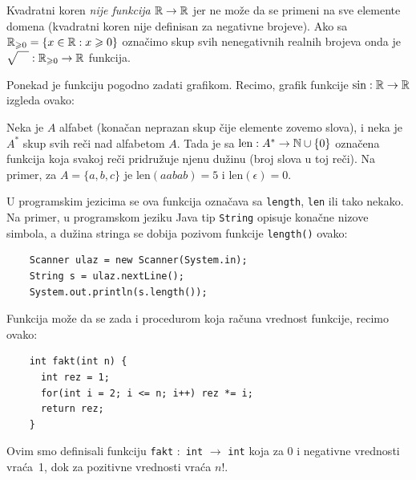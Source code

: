 \begin{EX}
  Kvadratni koren \emph{nije funkcija $\mathbb{R} \to \mathbb{R}$} jer ne mo\v ze da se primeni na sve elemente domena (kvadratni koren
  nije definisan za negativne brojeve). Ako sa $\mathbb{R}_{\geqslant 0} = \{x \in \mathbb{R} : x \geqslant 0\}$ ozna\v cimo skup svih
  nenegativnih realnih brojeva onda je $\sqrt{\mathstrut\quad} : \mathbb{R}_{\geqslant 0} \to \mathbb{R}$ funkcija.
\end{EX}

\begin{EX}
  Ponekad je funkciju pogodno zadati grafikom. Recimo, grafik funkcije
  $\sin : \mathbb{R} \to \mathbb{R}$ izgleda ovako:
  \begin{center}
    
  \end{center}
\end{EX}

\begin{EX}\label{ft08.ex.strlen}
  Neka je $A$ alfabet (kona\v can neprazan skup \v cije elemente zovemo slova), i neka je $A^*$ skup svih
  re\v ci nad alfabetom $A$. Tada je sa $\mathrm{len} : A^* \to \mathbb{N} \cup \{0\}$ ozna\v cena funkcija koja
  svakoj re\v ci pridru\v zuje njenu du\v zinu (broj slova u toj re\v ci). Na primer, za $A = \{a, b, c\}$
  je $\mathrm{len}(aabab) = 5$ i $\mathrm{len}(\epsilon) = 0$.
  
  U programskim jezicima se ova funkcija ozna\v cava sa \verb`length`, \verb`len` ili tako nekako. Na primer,
  u programskom jeziku Java tip \verb`String` opisuje kona\v cne nizove simbola, a du\v zina stringa se
  dobija pozivom funkcije \verb`length()` ovako:
{\small
\begin{verbatim}
    Scanner ulaz = new Scanner(System.in);
    String s = ulaz.nextLine();
    System.out.println(s.length());
\end{verbatim}
}
\end{EX}

\clearpage

\begin{EX}
  Funkcija mo\v ze da se zada i procedurom koja ra\v cuna vrednost funkcije, recimo ovako:
  {\small
  \begin{verbatim}
    int fakt(int n) {
      int rez = 1;
      for(int i = 2; i <= n; i++) rez *= i;
      return rez;
    }\end{verbatim}}
  \noindent
  Ovim smo definisali funkciju \texttt{fakt} $:$ \texttt{int} $\to$ \texttt{int} koja za 0 i negativne
  vrednosti vra\'ca~1, dok za pozitivne vrednosti vra\'ca $n!$.
\end{EX}

